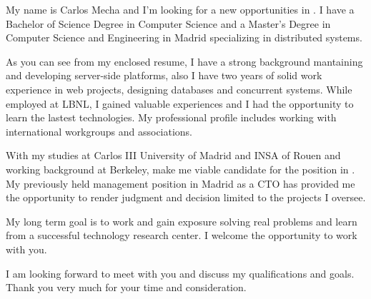 My name is Carlos Mecha and I'm looking for a new opportunities in \theRegion. I have a
Bachelor of Science Degree in Computer Science and a Master's Degree in
Computer Science and Engineering in Madrid specializing in distributed systems.

As you can see from my enclosed resume, I have a strong background mantaining
and developing server-side platforms, also I have two years of solid work
experience in web projects, designing databases and concurrent systems. While
employed at LBNL, I gained valuable experiences and I had the opportunity to
learn the lastest technologies. My professional profile includes working with
international workgroups and associations. 

With my studies at Carlos III University of Madrid and INSA of Rouen and
working background at Berkeley, make me viable candidate for the
\textbf{\thePosition} position in \theCompany. My previously held management
position in Madrid as a CTO has provided me the opportunity to render judgment
and decision limited to the projects I oversee.

My long term goal is to work and gain exposure solving real problems
and learn from a successful technology research center. I welcome the
opportunity to work with you.

I am looking forward to meet with you and discuss my qualifications and goals.
Thank you very much for your time and consideration.
